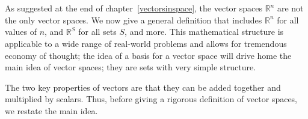\chapter{\vectorSpacesTitle}
\label{vectorSpaces}

As suggested at the end of chapter~\ref{vectorsinspace}, the vector spaces $\mathbb{R}^n$ are not the only vector spaces. 
We now give a general definition that  includes $\mathbb{R}^n$ for all values of $n$, and $\mathbb{R}^{S}$ for all sets $S$, and more.
This mathematical structure
is applicable to a wide range of real-world problems and allows for tremendous economy of thought; the idea of a basis for a vector space will drive home the main idea of vector spaces; they are sets with very simple structure. 


The two key properties of vectors are that they can be added together and multiplied by scalars. 
Thus, before giving a rigorous definition of vector spaces, we restate the main idea.\\

\begin{center} 
\end{center}



